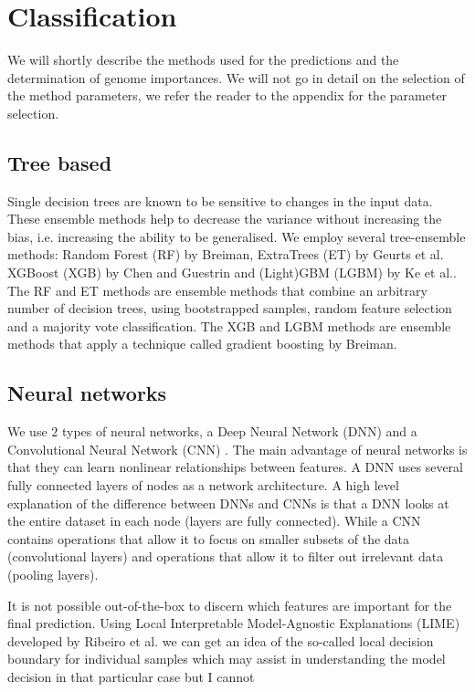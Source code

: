 \documentclass[a4paper,10pt]{article}
\begin{document}
\section{Classification}
%
We will shortly describe the methods used for the predictions and the determination of genome importances.
We will not go in detail on the selection of the method parameters, we refer the reader to the appendix for the
parameter selection.

\subsection{Tree based}

Single decision trees are known to be sensitive to changes in the input data. These ensemble methods 
help to decrease the variance without increasing the bias, i.e. increasing the ability to be generalised.
We employ several tree-ensemble methods: Random Forest (RF) by Breiman\cite{Breiman2001}, ExtraTrees (ET) by Geurts et al.\cite{Geurts2006} 
XGBoost (XGB) by Chen and Guestrin\cite{Chen2016} and (Light)GBM (LGBM) by Ke et al.\cite{Ke2017}.
The RF and ET methods are ensemble methods that combine an arbitrary number of decision trees, using bootstrapped samples,
random feature selection and a majority vote classification. The XGB and LGBM methods are ensemble methods 
that apply a technique called gradient boosting by Breiman\cite{Breiman1997}.
%
\subsection{Neural networks}
%
We use $2$ types of neural networks, a Deep Neural Network (DNN) \cite{lecun2015deep} and a Convolutional Neural Network (CNN) \cite{Lecun98}. 
The main advantage of neural networks is that they can learn nonlinear relationships between features. 
A DNN uses several fully connected layers of nodes as a network architecture. 
A high level explanation of the difference between DNNs and CNNs is that a DNN looks at the entire dataset in each node (layers are fully connected).
While a CNN contains operations that allow it to focus on smaller subsets of the data (convolutional layers) 
and operations that allow it to filter out irrelevant data (pooling layers). 

It is not possible out-of-the-box to discern which features are important for the final prediction. 
Using Local Interpretable Model-Agnostic Explanations (LIME) developed by Ribeiro et al.\cite{Ribeiro2016} 
we can get an idea of the so-called local decision boundary for individual samples which may assist in
understanding the model decision in that particular case but I cannot 
%
\end{document}
